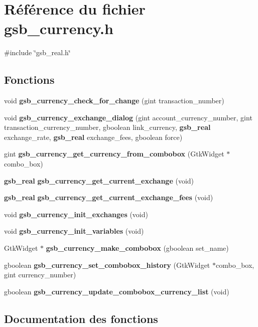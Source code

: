 \section{Référence du fichier gsb\_\-currency.h}
\label{gsb__currency_8h}
{\ttfamily \#include \char`\"{}gsb\_\-real.h\char`\"{}}\par
\subsection*{Fonctions}
\begin{DoxyCompactItemize}
\item 
void {\bf gsb\_\-currency\_\-check\_\-for\_\-change} (gint transaction\_\-number)
\item 
void {\bf gsb\_\-currency\_\-exchange\_\-dialog} (gint account\_\-currency\_\-number, gint transaction\_\-currency\_\-number, gboolean link\_\-currency, {\bf gsb\_\-real} exchange\_\-rate, {\bf gsb\_\-real} exchange\_\-fees, gboolean force)
\item 
gint {\bf gsb\_\-currency\_\-get\_\-currency\_\-from\_\-combobox} (GtkWidget $\ast$combo\_\-box)
\item 
{\bf gsb\_\-real} {\bf gsb\_\-currency\_\-get\_\-current\_\-exchange} (void)
\item 
{\bf gsb\_\-real} {\bf gsb\_\-currency\_\-get\_\-current\_\-exchange\_\-fees} (void)
\item 
void {\bf gsb\_\-currency\_\-init\_\-exchanges} (void)
\item 
void {\bf gsb\_\-currency\_\-init\_\-variables} (void)
\item 
GtkWidget $\ast$ {\bf gsb\_\-currency\_\-make\_\-combobox} (gboolean set\_\-name)
\item 
gboolean {\bf gsb\_\-currency\_\-set\_\-combobox\_\-history} (GtkWidget $\ast$combo\_\-box, gint currency\_\-number)
\item 
gboolean {\bf gsb\_\-currency\_\-update\_\-combobox\_\-currency\_\-list} (void)
\end{DoxyCompactItemize}


\subsection{Documentation des fonctions}
